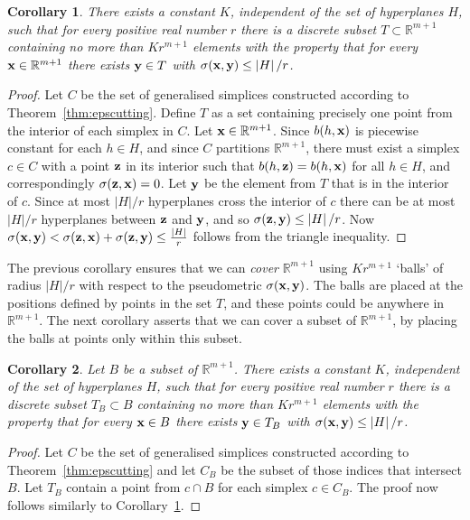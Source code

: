 \documentclass[aap,preprint]{imsart}
\newcommand{\reals}{{\mathbb R}}
\newcommand{\abs}[1]{\left\vert #1 \right\vert}
\newtheorem{corollary}{Corollary}
\begin{document}
\begin{corollary}\label{cor:epscutting}
There exists a constant $K$, independent of the set of hyperplanes $H$, such that for every positive real number $r$ there is a discrete subset $T \subset \reals^{m+1}$ containing no more than $K r^{m+1}$ elements with the property that for every $\xbf \in \reals^{m+1}$ there exists $\mathbf{y} \in T$ with $\sigma(\xbf, \ybf) \leq \abs{H}/r$.
\end{corollary}
\begin{proof}
Let $C$ be the set of generalised simplices constructed according to Theorem~\ref{thm:epscutting}.  Define $T$ as a set containing precisely one point from the interior of each simplex in $C$.  Let $\xbf \in \reals^{m+1}$.  Since $b(h, \mathbf{x})$ is piecewise constant for each $h \in H$, and since $C$ partitions $\reals^{m+1}$, there must exist a simplex $c \in C$ with a point $\mathbf{z}$ in its interior such that $b(h,\mathbf{z}) = b(h, \mathbf{x})$ for all $h \in H$, and correspondingly $\sigma(\mathbf{z}, \mathbf{x}) = 0$.  Let $\mathbf{y}$ be the element from $T$ that is in the interior of $c$.  Since at most $\abs{H}/r$ hyperplanes cross the interior of $c$ there can be at most $\abs{H}/r$ hyperplanes between $\mathbf{z}$ and $\mathbf{y}$, and so $\sigma(\zbf, \ybf) \leq \abs{H}/r$.  Now $\sigma(\xbf, \ybf) < \sigma(\zbf, \xbf) + \sigma(\zbf, \ybf) \leq \frac{\abs{H}}{r}$ follows from the triangle inequality.
\end{proof}

The previous corollary ensures that we can \emph{cover} $\reals^{m+1}$ using $K r^{m+1}$ `balls' of radius $\abs{H}/r$ with respect to the pseudometric $\sigma(\mathbf{x}, \mathbf{y})$.  The balls are placed at the positions defined by points in the set $T$, and these points could be anywhere in $\reals^{m+1}$.  The next corollary asserts that we can cover a subset of $\reals^{m+1}$, by placing the balls at points only within this subset.

\begin{corollary}\label{cor:epscuttingsubset}
Let $B$ be a subset of $\reals^{m+1}$.  There exists a constant $K$, independent of the set of hyperplanes $H$, such that for every positive real number $r$ there is a discrete subset $T_B \subset B$ containing no more than $K r^{m+1}$ elements with the property that for every $\mathbf{x} \in B$ there exists $\mathbf{y} \in T_B$ with $\sigma(\xbf, \ybf) \leq \abs{H}/r$.
\end{corollary}
\begin{proof}
Let $C$ be the set of generalised simplices constructed according to Theorem~\ref{thm:epscutting} and let $C_B$ be the subset of those indices that intersect $B$.  Let $T_B$ contain a point from $c \cap B$ for each simplex $c \in C_B$.  The proof now follows similarly to Corollary~\ref{cor:epscutting}.
\end{proof}
\end{document}
